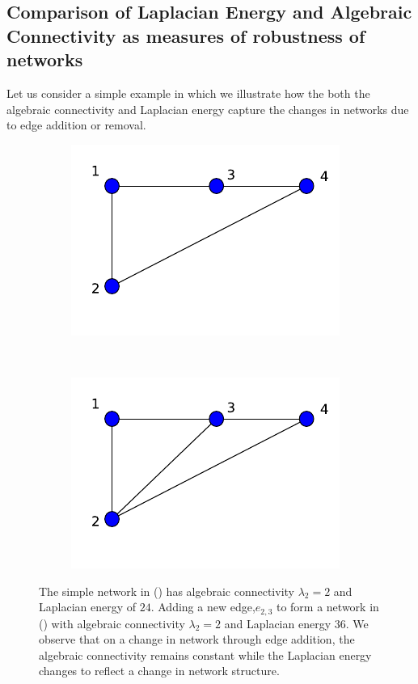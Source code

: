 \documentclass[10pt,a4paper]{article}
\begin{document}
\subsection{Comparison of Laplacian Energy and Algebraic Connectivity as measures of robustness of networks}
Let us consider a simple example in which we illustrate how the both the algebraic connectivity and Laplacian energy capture the changes in networks due to edge addition or removal. 
\begin{figure}[!h]
	\centering
	\begin{subfigure}[b]{0.3\textwidth}
		\includegraphics[width=\textwidth]{images/lap-algebraic.pdf}
		\caption{}
		\label{algebraic1}
	\end{subfigure}~
	\begin{subfigure}[b]{0.3\textwidth}
		\includegraphics[width= \textwidth]{images/lap-algebraic2.pdf}
		\caption{}
		\label{algebraic2}
	\end{subfigure}
	\caption{The simple network in () has algebraic connectivity $\lambda_2 = 2$ and Laplacian energy of $24$. Adding a new edge,$e_{2,3}$ to form a network in () with algebraic connectivity $\lambda_2 = 2$ and Laplacian energy $36$. We observe that on a change in network through edge addition, the algebraic connectivity remains constant while the Laplacian energy changes to reflect a change in network structure.}
	\label{}
\end{figure}
\end{document}
